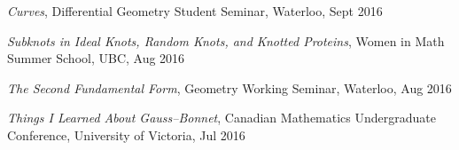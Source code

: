 \documentclass[letterpaper]{article}
\begin{document}
\begin{etaremune}

\item \emph{Curves}, Differential Geometry Student Seminar, Waterloo, Sept 2016

\item \emph{Subknots in Ideal Knots, Random Knots, and Knotted Proteins}, Women in Math Summer School, UBC, Aug 2016

\item \emph{The Second Fundamental Form}, Geometry Working Seminar, Waterloo, Aug 2016


\item \emph{Things I Learned About Gauss--Bonnet}, Canadian Mathematics Undergraduate Conference, University of Victoria, Jul 2016



\end{etaremune}
\end{document}
